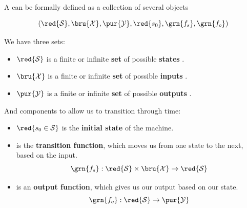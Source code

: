         \begin{definition}
            A  can be formally defined as a collection of several objects 
            
            \begin{equation*}
                (\red{\mathcal{S}}, \bru{\mathcal{X}}, \pur{\mathcal{Y}}, 
                \red{s_0}, \grn{f_s}, \grn{f_o})
            \end{equation*}
            
            We have three sets:
            
            \begin{itemize}
                \item $\red{\mathcal{S}}$ is a finite or infinite \textbf{set} of possible \textbf{states} .
                
                \item $\bru{\mathcal{X}}$ is a finite or infinite \textbf{set} of possible \textbf{inputs} .
                
                \item $\pur{\mathcal{Y}}$ is a finite or infinite \textbf{set} of possible \textbf{outputs} .
            \end{itemize}
            
            And components to allow us to transition through time:
            
            \begin{itemize}
                \item $\red{s_0 \in \mathcal{S}}$ is the \textbf{initial state} of the machine. 
                
                \item {} is the \textbf{transition function}, which moves us from one state to the next, based on the input.
                    \begin{equation*}
                        \grn{f_s}: \red{\mathcal{S}} \times \bru{\mathcal{X}}
                        \rightarrow \red{\mathcal{S}}
                    \end{equation*}

                \item {} is an \textbf{output function}, which gives us our output based on our state.
                    \begin{equation*}
                        \grn{f_o}: \red{\mathcal{S}} \rightarrow \pur{\mathcal{Y}}
                    \end{equation*}
            \end{itemize}
        \end{definition}
        
